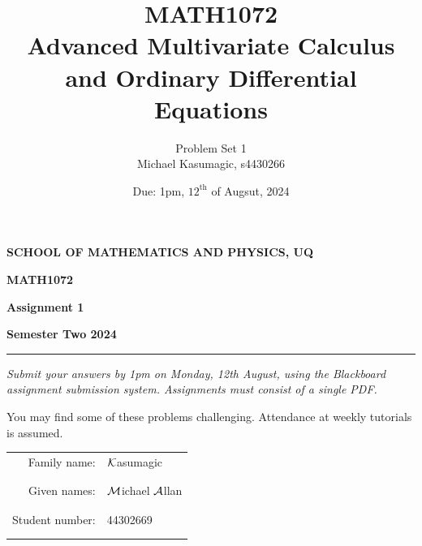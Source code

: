 \documentclass[a4paper, 11pt]{report}
\title{\Huge{MATH1072}\\Advanced Multivariate Calculus and Ordinary Differential Equations}
\author{\huge{Problem Set 1}\\\huge{Michael Kasumagic, s4430266}}
\date{\huge{Due: 1pm, $12^\text{th}$ of Augsut, 2024}}
\begin{document}
% 
\begin{center}
	{\bf SCHOOL OF MATHEMATICS AND PHYSICS, UQ}
	\end{center}
	\centerline{\large\bf MATH1072}
	\vspace{.1cm}   
	\centerline{\large\bf Assignment 1}
	\vspace{.1cm}
	\centerline{\large\bf Semester Two 2024}
	
	\vspace{3mm}
	\hrule
	\vspace{3mm}
	
	{\it Submit your answers by 1pm on Monday, 12th August, using the
	Blackboard assignment submission system. Assignments must consist of a single PDF.
	}
	
	You may find some of these problems challenging. Attendance at weekly tutorials is assumed.
	
	\vspace{1cm}
	
	\begin{tabular}{rl}
	Family name: & $\mathcal{K}$asumagic \\
	& \\
	& \\
	Given names: & $\mathcal{M}$ichael $\mathcal{A}$llan \\
	& \\
	& \\
	Student number: & 44302669 \\
	& \\
	& \\
	\end{tabular}
	
\end{document}
